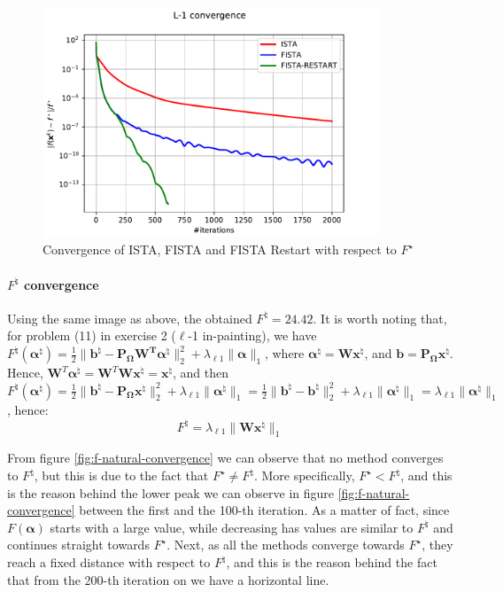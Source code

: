 \documentclass[12pt]{article}
\begin{document}
\begin{figure}[H]
    \centering
    \includegraphics[width=10cm]{hw3/codes/exercise2/results/f_star_convergence.pdf}
    \caption{Convergence of ISTA, FISTA and FISTA Restart with respect to $F^\star$}
    \label{fig:f-star-convergence}
\end{figure}

\paragraph{\texorpdfstring{$F^{\natural}$}{Lg} convergence}
Using the same image as above, the obtained $F^{\natural} = 24.42$. It is worth noting that, for problem (11) in exercise 2 ($\ell$-1 in-painting), we have $F^{\natural}(\bm{\alpha}^{\natural}) = \frac{1}{2} \lVert \mathbf{b}^{\natural} - \mathbf{P_{\Omega}\mathbf{W}^T\bm{\alpha}^{\natural}} \rVert_{2}^{2} + \lambda_{\ell1} \lVert \bm{\alpha} \rVert_1$, where $\bm{\alpha}^{\natural} = \mathbf{W} \mathbf{x}^{\natural}$, and $\mathbf{b} = \mathbf{P_{\Omega}} \mathbf{x}^{\natural}$. Hence, $\mathbf{W}^T\bm{\alpha}^{\natural} =  \mathbf{W}^T \mathbf{W} \mathbf{x}^{\natural} = \mathbf{x}^{\natural}$, and then $F^{\natural}(\bm{\alpha}^{\natural}) = \frac{1}{2} \lVert \mathbf{b}^{\natural} - \mathbf{P_{\Omega}\mathbf{x}^{\natural}} \rVert_{2}^{2} + \lambda_{\ell 1} \lVert \bm{\alpha}^{\natural} \rVert_1 = \frac{1}{2} \lVert \mathbf{b}^{\natural} - \mathbf{b}^{\natural} \rVert_{2}^{2} + \lambda_{\ell 1} \lVert \bm{\alpha}^{\natural} \rVert_1 = \lambda_{\ell 1} \lVert \bm{\alpha}^{\natural} \rVert_1$, hence:
\begin{equation}
    F^{\natural} = \lambda_{\ell 1} \lVert \mathbf{W} \mathbf{x}^{\natural} \rVert_1
\end{equation}

From figure \ref{fig:f-natural-convergence} we can observe that no method converges to $F^{\natural}$, but this is due to the fact that $F^{\star} \neq F^{\natural}$. More specifically, $F^{\star} < F^{\natural}$, and this is the reason behind the lower peak we can observe in figure \ref{fig:f-natural-convergence} between the first and the 100-th iteration. As a matter of fact, since $F(\bm{\alpha})$ starts with a large value, while decreasing has values are similar to $F^{\natural}$ and continues straight towards $F^{\star}$. Next, as all the methods converge towards $F^{\star}$, they reach a fixed distance with respect to $F^{\natural}$, and this is the reason behind the fact that from the 200-th iteration on we have a horizontal line.
\end{document}
